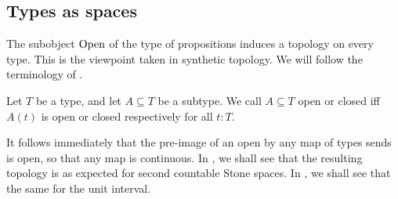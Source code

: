 \subsection{Types as spaces}
The subobject $\mathrm{Open}$ of the type of propositions induces a topology on every type. 
This is the viewpoint taken in synthetic topology. 
We will follow the terminology of \cite{SyntheticTopologyEscardo, SyntheticTopologyLesnik}. 

\begin{definition}
  Let $T$ be a type, and let $A\subseteq T$ be a subtype. 
  We call $A\subseteq T$ open or closed iff $A(t)$ is open or closed respectively for all $t:T$.
\end{definition}

\begin{remark}
  It follows immediately that the pre-image of an open by any map of types sends is open, so that any map is continuous. 
  In , we shall see that the resulting topology is as expected for second countable Stone spaces.
  In , we shall see that the same for the unit interval. 
\end{remark}



